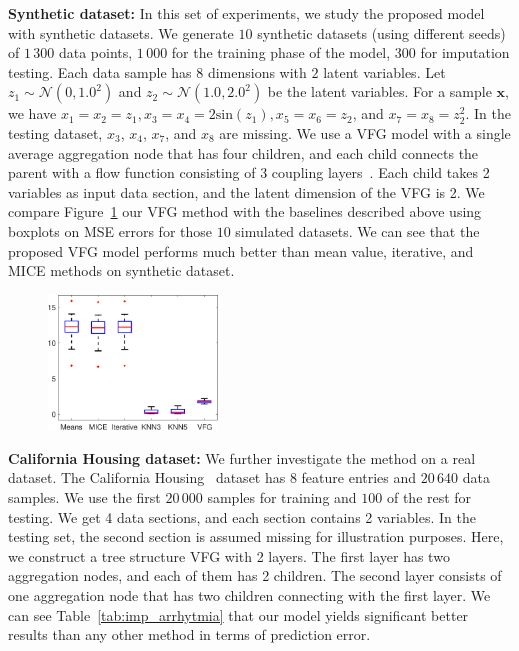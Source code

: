 \documentclass[twoside]{article}
\begin{document}
\textbf{Synthetic dataset: }
In this set of experiments, we study the proposed model with synthetic datasets.
We generate $10$ synthetic datasets (using different seeds) of $1\,300$ data points, $1\,000$ for the training phase of the model, $300$ for imputation testing. 
Each data sample  has $8$ dimensions with $2$ latent variables. 
Let $z_1 \sim \mathcal{N}(0,1.0^2)$ and $z_2 \sim  \mathcal{N}(1.0,2.0^2)$ be the latent variables. For a sample $\mathbf{x}$, we have  $x_1=x_2 = z_1, x_3=x_4= 2\textrm{sin}(z_1), x_5=x_6 =z_2$, and $x_7= x_8 = z_2^2$.  In the testing dataset, $x_3$, $x_4$, $x_7$, and $x_8$ are missing. We use a VFG model with a single average aggregation node that has four children, and each child connects the parent with a flow function consisting of 3 coupling layers~\cite{Dinh2016DensityEU}. 
Each child takes 2 variables as input data section, and the latent dimension of the VFG is 2.
We compare Figure~\ref{fig:sim} our VFG method with the baselines described above using boxplots on MSE errors for those $10$ simulated datasets.
We can see that the proposed VFG model performs much better than mean value, iterative, and MICE methods on synthetic dataset.  
\begin{figure}[ht]
    \centering
       \includegraphics[width=0.4\textwidth]{fig/sim_box.eps}
    \label{fig:sim}
  \end{figure}

\textbf{California Housing dataset: }
We further investigate the method on a real dataset.  
The California Housing~\cite{ch_sklearn} dataset  has 8 feature entries and $20\,640$ data samples. 
We use the first $20\,000$ samples for training  and $100$ of the rest for testing.  
We get  4 data sections, and each section contains 2 variables. 
In the testing set, the second section is assumed missing for illustration purposes. 
Here, we construct a tree structure VFG with 2 layers. 
The first layer has two aggregation nodes, and each of them has 2 children. The second layer consists of one aggregation node that has two children connecting with the first layer. 
We can see Table~\ref{tab:imp_arrhytmia} that our model yields significant better results than any other method in terms of prediction error. 
\end{document}
